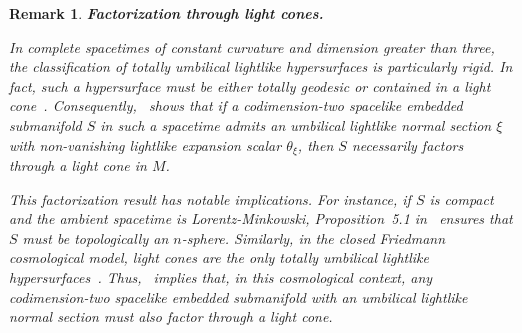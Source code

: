 \documentclass[11pt]{article}
\numberwithin{equation}{section}
\newtheorem{remark}[theorem]{Remark}
\begin{document}
	\begin{remark}\label{remark:cones}
		\textbf{Factorization through light cones.} \normalfont 
		
		In complete spacetimes of constant curvature and dimension greater than three, the classification of totally umbilical lightlike hypersurfaces is particularly rigid. In fact, such a hypersurface must be either totally geodesic or contained in a light cone~\cite{AkivisGoldberg}. Consequently,~ shows that if a codimension-two spacelike embedded submanifold $S$ in such a spacetime admits an umbilical lightlike normal section $\xi$ with non-vanishing lightlike expansion scalar $\theta_\xi$, then $S$ necessarily factors through a light cone in $M$.

This factorization result has notable implications. For instance, if $S$ is compact and the ambient spacetime is Lorentz-Minkowski, Proposition~5.1 in~\cite{PalmasPalomoRomero} ensures that $S$ must be topologically an $n$-sphere. Similarly, in the closed Friedmann cosmological model, light cones are the only totally umbilical lightlike hypersurfaces~\cite{gutierrez15}. Thus,~ implies that, in this cosmological context, any codimension-two spacelike embedded submanifold with an umbilical lightlike normal section must also factor through a light cone.
		
	\end{remark}
\end{document}
